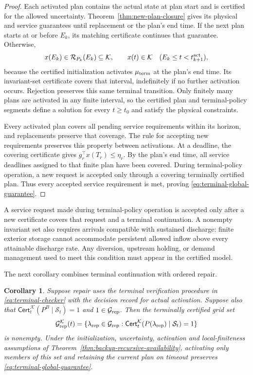 \documentclass[final]{cas-sc}
\theoremstyle{definition}
\theoremstyle{plain}
\newtheorem{corollary}{Corollary}
\theoremstyle{definition}
\theoremstyle{plain}
\begin{document}
\begin{proof}
Each activated plan contains the actual state at plan start and is certified
for the allowed uncertainty. Theorem~\ref{thm:new-plan-closure} gives
its physical and service guarantees until replacement or the plan's end time.
If the next plan starts at or before $E_k$, its matching certificate
continues that guarantee. Otherwise,
\[
 x(E_k)\in\mathcal R_{P_k}(E_k)\subseteq\mathcal K,
 \qquad x(t)\in\mathcal K\quad(E_k\le t<t_{k+1}^{\rm act}),
\]
because the certified initialization activates $\mu_{\rm term}$ at the plan's end time.
Its invariant-set certificate covers that interval, indefinitely if
no further activation occurs. Rejection preserves this same terminal
transition. Only finitely many plans are activated in any finite
interval, so the certified plan and terminal-policy segments define
a solution for every $t\ge t_0$ and satisfy the physical constraints.

Every activated plan covers all pending service requirements
within its horizon, and replacements preserve that coverage. The rule
for accepting new requirements preserves this property between activations. At a
deadline, the covering certificate gives $g_r^\top x(T_r)\le\eta_r$.
By the plan's end time, all service deadlines assigned to that finite plan have been covered.
During terminal-policy operation, a new request is accepted only
through a covering terminally certified plan. Thus every accepted service
requirement is met, proving \eqref{eq:terminal-global-guarantee}.
\end{proof}

A service request made during terminal-policy operation is accepted
only after a new certificate covers that request and a terminal
continuation. A nonempty invariant set also requires arrivals compatible
with sustained discharge: finite exterior storage cannot accommodate
persistent allowed inflow above every attainable discharge rate. Any
diversion, upstream holding, or demand management used to meet this
condition must appear in the certified model.

The next corollary combines terminal continuation with ordered repair.

\begin{corollary}
\label{cor:repair-recursive}
Suppose repair uses the terminal verification procedure in
\eqref{eq:terminal-checker} with the decision record for actual
activation. Suppose also that
$\mathsf{Cert}^{\mathcal K}_t(P^B\mid\mathcal S_t)=1$ and
$1\in\mathcal G_{\rm rep}$. Then the terminally certified grid set
\begin{equation}
\mathcal G_{\rm rep}^{\mathcal K}(t)=
\{\lambda_{\rm rep}\in\mathcal G_{\rm rep}:
\mathsf{Cert}^{\mathcal K}_t(P(\lambda_{\rm rep})\mid\mathcal S_t)=1\}
\label{eq:repair-terminal-grid}
\end{equation}
is nonempty. Under the initialization, uncertainty, activation and
local-finiteness assumptions of
Theorem~\ref{thm:backup-recursive-availability}, activating only members
of this set and retaining the current plan on timeout preserves
\eqref{eq:terminal-global-guarantee}.
\end{corollary}
\end{document}
